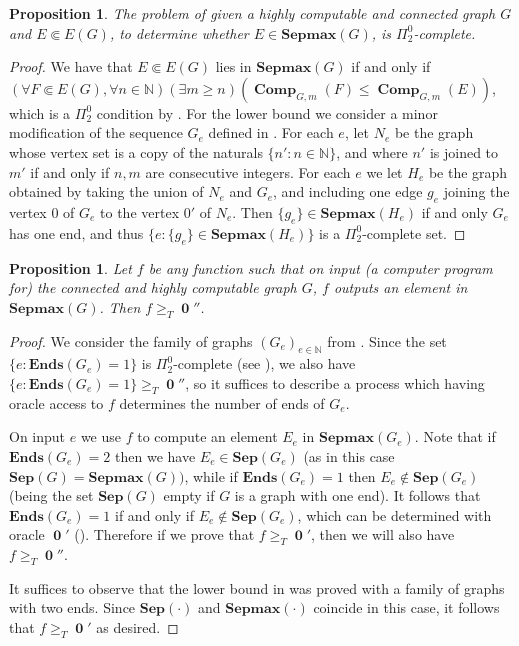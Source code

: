 \documentclass[10pt,A4]{amsart}
\newtheorem{prop}[thm]{Proposition}
\theoremstyle{definition}
\theoremstyle{definition}
\newcommand{\N}{\mathbb{N}}
\newcommand{\sep}[1]{\mathbf{Sep}({#1})}
\newcommand{\Ends}[1]{\mathbf{Ends}({#1})}
\newcommand{\sepmax}[1]{\mathbf{Sepmax}({#1})}
\newcommand{\HP}{\operatorname{\mathbf{0}} '}
\newcommand{\comp}{\operatorname{\mathbf{Comp}}}
\begin{document}
\begin{prop}\label{Determining-membership-in-sepmax-uniformly-is-Pi2}The problem of given a highly computable and connected graph $G$ and $E\Subset E(G)$, to determine whether $E\in \sepmax{G}$, is $\Pi_2^0$-complete. 
\end{prop}
\begin{proof}
We have that $E\Subset E(G)$ lies in $\sepmax{G}$ if and only if $(\forall F\Subset E(G),\forall n\in\N)(\exists m\geq n)(\comp_{G,m}(F)\leq \comp_{G,m}(E))$, which is a $\Pi_2^0$ condition by .  For the lower bound we consider a minor modification of the sequence $G_e$ defined in  . For each $e$, let $N_e$ be the graph whose vertex set is a copy of the naturals $\{n' : n\in\N\}$, and where $n'$ is joined to $m'$ if and only if $n,m$ are consecutive integers. For each $e$ we let $H_e$ be the graph obtained by taking the union of $N_e$ and $G_e$, and including one edge $g_e$ joining the vertex $0$ of $G_e$ to the vertex $0'$ of $N_e$. Then $\{g_e\}\in\sepmax{H_e}$ if and only $G_e$ has one end, and thus $\{e : \{g_e\}\in\sepmax{H_e}\}$ is a $\Pi_2^0$-complete set. 
\end{proof}
\begin{prop}\label{prop:lower-bound-sepmax}
Let $f$ be any function such that on input (a computer program for) the connected and highly computable graph $G$, $f$ outputs an element in $\sepmax{G}$. Then $f\geq_T\HP'$.
\end{prop}
\begin{proof}    
    We consider the family of graphs $(G_e)_{e\in\N}$  from . Since the set $\{e : \Ends{G_e}=1\}$ is $\Pi_2^0$-complete (see ), we also have $\{e : \Ends{G_e}=1\}\geq_T\HP'$, so it suffices to describe a process which having oracle access to $f$ determines the number of ends of $G_e$. 
    
    On input $e$ we use $f$ to compute an element $E_e$ in $\sepmax{G_e}$. Note that if $\Ends{G_e}=2$ then we have $E_e\in\sep{G_e}$ (as in this case $\sep{G}=\sepmax{G})$, while if  $\Ends{G_e}=1$ then  $E_e\not\in\sep{G_e}$ (being the set $\sep{G}$ empty if $G$ is a graph with one end). It follows that $\Ends{G_e}=1$ if and only if $E_e\not\in\sep{G_e}$, which can be determined with oracle $\HP$  (). Therefore if we prove that $f\geq_T\HP$, then we will also have  $f\geq_T\HP'$.

    It suffices to observe that the lower bound in   was proved with a family of graphs with two ends. Since $\sep{\cdot}$ and $\sepmax{\cdot}$ coincide in this case, it follows that $f\geq_T\HP$ as desired.
\end{proof}
\end{document}
